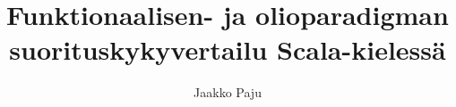 \documentclass[a4paper,12pt,language=finnish,version=final,hidechapters=true,includereferences=false,realtimesnewroman=false,sharelatex=false,emptyfirstpages=true]{utuftthesis}
\begin{document}
\begin{comment}
Want to fix something in the template? Send a merge.\\
\\
Relies on utuftthesis.cls for the document class definitions.
\end{comment}

\title{Funktionaalisen- ja olioparadigman suorituskykyvertailu Scala-kielessä}
\author{Jaakko Paju}

\maketitle


\pagestyle{empty}

\tableofcontents



%
%
\begin{comment}
The thesis starts here.

To better organize things, create a new tex file for each chapter
and input it below.

Avoid using the å, ä, ö or <space> characters in referred names and
underscores \_ in file names (may break hyperref).

Good luck!
\end{comment}







\printbibliography

\begin{comment}
Create your appendix chapters with command \textbackslash appchapter\{some
name\} instead of \textbackslash chapter\{some name\} for the automagic
page counting to work!
\end{comment}
\end{document}
